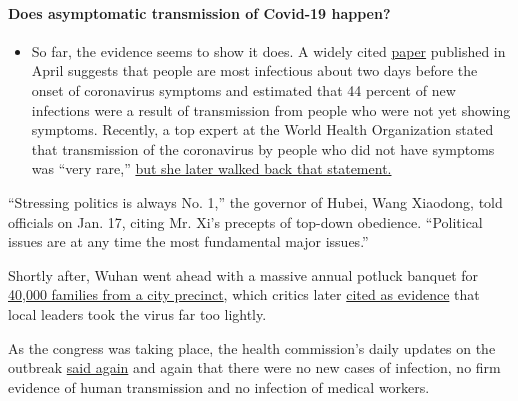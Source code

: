 \begin{itemize}
{  \paragraph{Does asymptomatic transmission of Covid-19
  happen?}\label{does-asymptomatic-transmission-of-covid-19-happen}}

  \begin{itemize}
  \tightlist
  \item
    So far, the evidence seems to show it does. A widely cited
    \href{https://www.nature.com/articles/s41591-020-0869-5}{paper}
    published in April suggests that people are most infectious about
    two days before the onset of coronavirus symptoms and estimated that
    44 percent of new infections were a result of transmission from
    people who were not yet showing symptoms. Recently, a top expert at
    the World Health Organization stated that transmission of the
    coronavirus by people who did not have symptoms was ``very rare,''
    \href{https://www.nytimes3xbfgragh.onion/2020/06/09/world/coronavirus-updates.html?action=click\&pgtype=Article\&state=default\&region=MAIN_CONTENT_3\&context=storylines_faq\#link-1f302e21}{but
    she later walked back that statement.}
  \end{itemize}
\end{itemize}

``Stressing politics is always No. 1,'' the governor of Hubei, Wang
Xiaodong, told officials on Jan. 17, citing Mr. Xi's precepts of
top-down obedience. ``Political issues are at any time the most
fundamental major issues.''

Shortly after, Wuhan went ahead with a massive annual potluck banquet
for
\href{https://news.sina.com.cn/s/2020-01-21/doc-iihnzhha3843904.shtml}{40,000
families from a city precinct}, which critics later
\href{https://www.dwnews.com/\%E4\%B8\%AD\%E5\%9B\%BD/60165812/\%E6\%AD\%A6\%E6\%B1\%89\%E8\%82\%BA\%E7\%82\%8E\%E7\%96\%AB\%E6\%83\%85\%E6\%AD\%A6\%E6\%B1\%89\%E7\%A4\%BE\%E5\%8C\%BA\%E8\%BF\%98\%E5\%9C\%A8\%E4\%B8\%BE\%E5\%8A\%9E\%E4\%B8\%87\%E5\%AE\%B6\%E5\%AE\%B4\%E5\%B8\%82\%E9\%95\%BF\%E5\%9B\%9E\%E5\%BA\%94}{cited
as evidence} that local leaders took the virus far too lightly.

As the congress was taking place, the health commission's daily updates
on the outbreak
\href{http://wjw.wuhan.gov.cn/front/web/showDetail/2020011109036}{said
again} and again that there were no new cases of infection, no firm
evidence of human transmission and no infection of medical workers.

